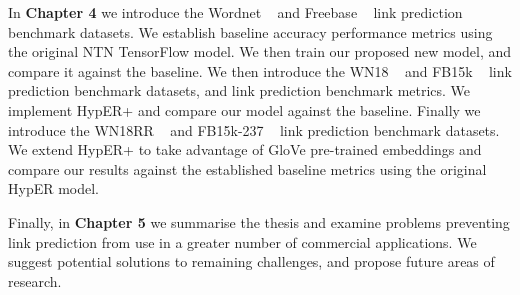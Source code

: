 \noindent In \textbf{Chapter 4} we introduce the Wordnet \unskip ~\citep{miller1995wordnet} and Freebase \unskip ~\citep{bollacker2008freebase} link prediction benchmark datasets. We establish baseline accuracy performance metrics using the original NTN TensorFlow model. We then train our proposed new model, and compare it against the baseline. We then introduce the WN18 \unskip ~\citep{bordes2014semantic} and FB15k \unskip ~\citep{bordes2013translating} link prediction benchmark datasets, and link prediction benchmark metrics. We implement HypER+ and compare our model against the baseline. Finally we introduce the WN18RR \unskip ~\citep{dettmers2018convolutional} and FB15k-237 \unskip ~\citep{toutanova2015observed} link prediction benchmark datasets. We extend HypER+ to take advantage of GloVe pre-trained embeddings and compare our results against the established baseline metrics using the original HypER model. \par

\noindent Finally, in \textbf{Chapter 5} we summarise the thesis and examine problems preventing link prediction from use in a greater number of commercial applications. We suggest potential solutions to remaining challenges, and propose future areas of research.

